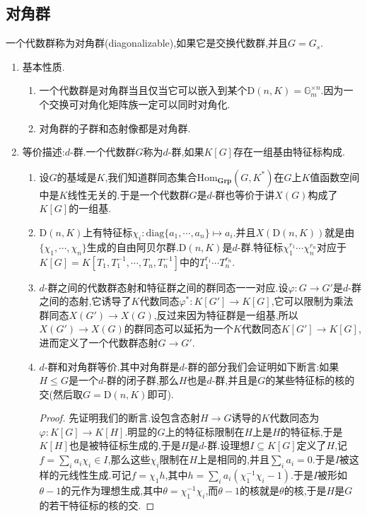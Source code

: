 \subsection{对角群}

一个代数群称为对角群(diagonalizable),如果它是交换代数群,并且$G=G_s$.
\begin{enumerate}
	\item 基本性质.
	\begin{enumerate}[(1)]
		\item 一个代数群是对角群当且仅当它可以嵌入到某个$\mathrm{D}(n,K)=\mathbb{G}_m^{\times n}$.因为一个交换可对角化矩阵族一定可以同时对角化.
		\item 对角群的子群和态射像都是对角群.
	\end{enumerate}
	\item 等价描述:$d$-群.一个代数群$G$称为$d$-群,如果$K[G]$存在一组基由特征标构成.
	\begin{enumerate}[(1)]
		\item 设$G$的基域是$K$,我们知道群同态集合$\mathrm{Hom}_{\textbf{Grp}}(G,K^*)$在$G$上$K$值函数空间中是$K$线性无关的.于是一个代数群$G$是$d$-群也等价于讲$X(G)$构成了$K[G]$的一组基.
		\item $\mathrm{D}(n,K)$上有特征标$\chi_i:\mathrm{diag}\{a_1,\cdots,a_n\}\mapsto a_i$.并且$X(\mathrm{D}(n,K))$就是由$\{\chi_1,\cdots,\chi_n\}$生成的自由阿贝尔群.$\mathrm{D}(n,K)$是$d$-群.特征标$\chi_1^{r_1}\cdots\chi_n^{r_n}$对应于$K[G]=K[T_1,T_1^{-1},\cdots,T_n,T_n^{-1}]$中的$T_1^{r_1}\cdots T_n^{r_n}$.
		\item $d$-群之间的代数群态射和特征群之间的群同态一一对应.设$\varphi:G\to G'$是$d$-群之间的态射,它诱导了$K$代数同态$\varphi^*:K[G']\to K[G]$,它可以限制为乘法群同态$X(G')\to X(G)$,反过来因为特征群是一组基,所以$X(G')\to X(G)$的群同态可以延拓为一个$K$代数同态$K[G']\to K[G]$,进而定义了一个代数群态射$G\to G'$.
		\item $d$-群和对角群等价.其中对角群是$d$-群的部分我们会证明如下断言:如果$H\le G$是一个$d$-群的闭子群,那么$H$也是$d$-群,并且是$G$的某些特征标的核的交(然后取$G=\mathrm{D}(n,K)$即可).
		\begin{proof}
			
			先证明我们的断言.设包含态射$H\to G$诱导的$K$代数同态为$\varphi:K[G]\to K[H]$.明显的$G$上的特征标限制在$H$上是$H$的特征标,于是$K[H]$也是被特征标生成的,于是$H$是$d$-群.设理想$I\subseteq K[G]$定义了$H$,记$f=\sum_ia_i\chi_i\in I$,那么这些$\chi_i$限制在$H$上是相同的,并且$\sum_ia_i=0$.于是$I$被这样的元线性生成.可记$f=\chi_1h$,其中$h=\sum_ia_i(\chi_1^{-1}\chi_i-1)$.于是$I$被形如$\theta-1$的元作为理想生成,其中$\theta=\chi_1^{-1}\chi_i$,而$\theta-1$的核就是$\theta$的核,于是$H$是$G$的若干特征标的核的交.
			

\end{proof}
\end{enumerate}
\end{enumerate}

